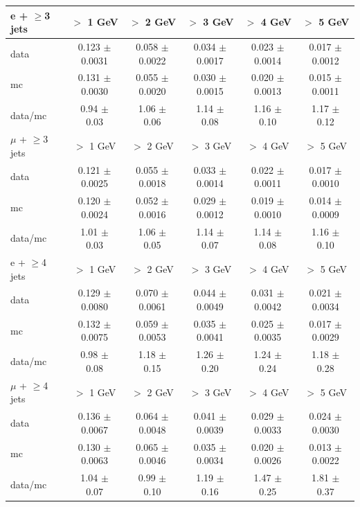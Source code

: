 \begin{table}[!ht]
\begin{center}
\begin{tabular}{l|c|c|c|c|c}
\hline
\hline
e + $\geq$3 jets   &           $>$ 1 GeV   &           $>$ 2 GeV   &           $>$ 3 GeV   &           $>$ 4 GeV   &           $>$ 5 GeV  \\
\hline
      data   &  0.123 $\pm$ 0.0031   &  0.058 $\pm$ 0.0022   &  0.034 $\pm$ 0.0017   &  0.023 $\pm$ 0.0014   &  0.017 $\pm$ 0.0012  \\
        mc   &  0.131 $\pm$ 0.0030   &  0.055 $\pm$ 0.0020   &  0.030 $\pm$ 0.0015   &  0.020 $\pm$ 0.0013   &  0.015 $\pm$ 0.0011  \\
   data/mc   &     0.94 $\pm$ 0.03   &     1.06 $\pm$ 0.06   &     1.14 $\pm$ 0.08   &     1.16 $\pm$ 0.10   &     1.17 $\pm$ 0.12  \\

\hline
\hline
$\mu$ + $\geq$3 jets   &           $>$ 1 GeV   &           $>$ 2 GeV   &           $>$ 3 GeV   &           $>$ 4 GeV   &           $>$ 5 GeV  \\
\hline
      data   &  0.121 $\pm$ 0.0025   &  0.055 $\pm$ 0.0018   &  0.033 $\pm$ 0.0014   &  0.022 $\pm$ 0.0011   &  0.017 $\pm$ 0.0010  \\
        mc   &  0.120 $\pm$ 0.0024   &  0.052 $\pm$ 0.0016   &  0.029 $\pm$ 0.0012   &  0.019 $\pm$ 0.0010   &  0.014 $\pm$ 0.0009  \\
   data/mc   &     1.01 $\pm$ 0.03   &     1.06 $\pm$ 0.05   &     1.14 $\pm$ 0.07   &     1.14 $\pm$ 0.08   &     1.16 $\pm$ 0.10  \\

\hline
\hline
e + $\geq$4 jets   &           $>$ 1 GeV   &           $>$ 2 GeV   &           $>$ 3 GeV   &           $>$ 4 GeV   &           $>$ 5 GeV  \\
\hline
      data   &  0.129 $\pm$ 0.0080   &  0.070 $\pm$ 0.0061   &  0.044 $\pm$ 0.0049   &  0.031 $\pm$ 0.0042   &  0.021 $\pm$ 0.0034  \\
        mc   &  0.132 $\pm$ 0.0075   &  0.059 $\pm$ 0.0053   &  0.035 $\pm$ 0.0041   &  0.025 $\pm$ 0.0035   &  0.017 $\pm$ 0.0029  \\
   data/mc   &     0.98 $\pm$ 0.08   &     1.18 $\pm$ 0.15   &     1.26 $\pm$ 0.20   &     1.24 $\pm$ 0.24   &     1.18 $\pm$ 0.28  \\

\hline
\hline
$\mu$ + $\geq$4 jets   &           $>$ 1 GeV   &           $>$ 2 GeV   &           $>$ 3 GeV   &           $>$ 4 GeV   &           $>$ 5 GeV  \\
\hline
      data   &  0.136 $\pm$ 0.0067   &  0.064 $\pm$ 0.0048   &  0.041 $\pm$ 0.0039   &  0.029 $\pm$ 0.0033   &  0.024 $\pm$ 0.0030  \\
        mc   &  0.130 $\pm$ 0.0063   &  0.065 $\pm$ 0.0046   &  0.035 $\pm$ 0.0034   &  0.020 $\pm$ 0.0026   &  0.013 $\pm$ 0.0022  \\
   data/mc   &     1.04 $\pm$ 0.07   &     0.99 $\pm$ 0.10   &     1.19 $\pm$ 0.16   &     1.47 $\pm$ 0.25   &     1.81 $\pm$ 0.37  \\

\hline
\hline

\end{tabular}
\end{center}
\end{table}


